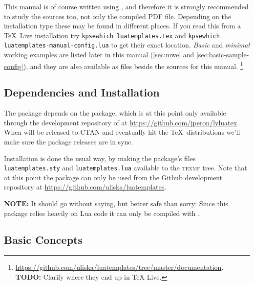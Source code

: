 \documentclass{scrartcl}
\begin{document}
This manual is of course written using , and therefore it
is strongly recommended to study the sources too, not only the compiled PDF
file.  Depending on the installation type these may be found in different
places.  If you read this from a \TeX\ Live installation try \texttt{kpsewhich
luatemplates.tex} and \texttt{kpsewhich luatemplates-manual-config.lua} to get
their exact location.  \emph{Basic} and \emph{minimal} working examples are
listed later in this manual (\vref{sec:mwe} and
\vref{sec:basic-sample-config}), and they are also available as files beside
the sources for this manual.%
\footnote{\url{https://github.com/uliska/luatemplates/tree/master/documentation}.\\
\textbf{TODO:} Clarify where they end up in TeX Live.}


\subsection{Dependencies and Installation}
\label{sec:dependencies-and-installation}

The package depends on the  package, which is at this
point only available through the development repository of  at
\url{https://github.com/jperon/lyluatex}.  When  will be
released to CTAN and eventually hit the \TeX\ distributions we'll make sure the
package releases are in sync.

Installation is done the usual way, by making the package's files
\texttt{luatemplates.sty} and \texttt{luatemplates.lua} available to the
\textsc{texmf} tree. Note that at this point the package can only be used from
the Github development repository at
\url{https://github.com/uliska/luatemplates}.

\textbf{NOTE:} It should go without saying, but better safe than sorry: Since
this package relies heavily on Lua code it can only be compiled with
.


\subsection{Basic Concepts}
\label{sec:basic-concepts}
\end{document}
